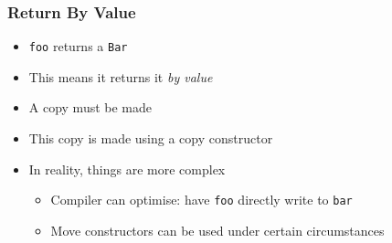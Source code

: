 \begin{frame}
  \frametitle{Return By Value}
  \begin{itemize}
    \item {\tt foo} returns a {\tt Bar}
    \item This means it returns it \emph{by value}
    \item A copy must be made
    \item This copy is made using a copy constructor
    \item In reality, things are more complex
          \begin{itemize}
            \item Compiler can optimise: have {\tt foo} directly write to {\tt bar}
            \item Move constructors can be used under certain circumstances
          \end{itemize}
  \end{itemize}
\end{frame}

